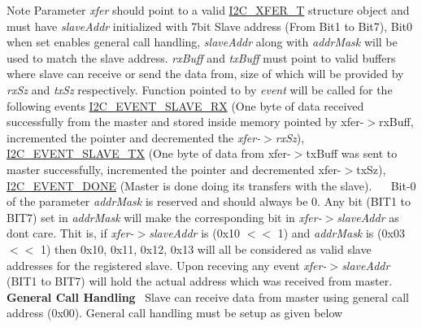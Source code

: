 \begin{DoxyNote}{Note}
Parameter {\itshape xfer} should point to a valid \hyperlink{structI2C__XFER__T}{I2\+C\+\_\+\+X\+F\+E\+R\+\_\+T} structure object and must have {\itshape slave\+Addr} initialized with 7bit Slave address (From Bit1 to Bit7), Bit0 when set enables general call handling, {\itshape slave\+Addr} along with {\itshape addr\+Mask} will be used to match the slave address. {\itshape rx\+Buff} and {\itshape tx\+Buff} must point to valid buffers where slave can receive or send the data from, size of which will be provided by {\itshape rx\+Sz} and {\itshape tx\+Sz} respectively. Function pointed to by {\itshape event} will be called for the following events \hyperlink{group__I2C__17XX__40XX_ggacb2cd4e03ea48339d327e4f387441bf3a290fcc1bb657102af26daa1b84472848}{I2\+C\+\_\+\+E\+V\+E\+N\+T\+\_\+\+S\+L\+A\+V\+E\+\_\+\+RX} (One byte of data received successfully from the master and stored inside memory pointed by xfer-\/$>$rx\+Buff, incremented the pointer and decremented the {\itshape xfer-\/$>$rx\+Sz}), \hyperlink{group__I2C__17XX__40XX_ggacb2cd4e03ea48339d327e4f387441bf3a3911d9b6505f77f0bed3f21b2710ca58}{I2\+C\+\_\+\+E\+V\+E\+N\+T\+\_\+\+S\+L\+A\+V\+E\+\_\+\+TX} (One byte of data from xfer-\/$>$tx\+Buff was sent to master successfully, incremented the pointer and decremented xfer-\/$>$tx\+Sz), \hyperlink{group__I2C__17XX__40XX_ggacb2cd4e03ea48339d327e4f387441bf3a43d00f7d92100d4af6df5514e4ccf1d1}{I2\+C\+\_\+\+E\+V\+E\+N\+T\+\_\+\+D\+O\+NE} (Master is done doing its transfers with the slave).~\newline
 ~\newline
Bit-\/0 of the parameter {\itshape addr\+Mask} is reserved and should always be 0. Any bit (B\+I\+T1 to B\+I\+T7) set in {\itshape addr\+Mask} will make the corresponding bit in {\itshape xfer-\/$>$slave\+Addr} as don\textquotesingle{}t care. Thit is, if {\itshape xfer-\/$>$slave\+Addr} is (0x10 $<$$<$ 1) and {\itshape addr\+Mask} is (0x03 $<$$<$ 1) then 0x10, 0x11, 0x12, 0x13 will all be considered as valid slave addresses for the registered slave. Upon receving any event {\itshape xfer-\/$>$slave\+Addr} (B\+I\+T1 to B\+I\+T7) will hold the actual address which was received from master.~\newline
 ~\newline
{\bfseries General Call Handling}~\newline
 Slave can receive data from master using general call address (0x00). General call handling must be setup as given below
\begin{DoxyItemize}

\end{DoxyItemize}
\end{DoxyNote}
